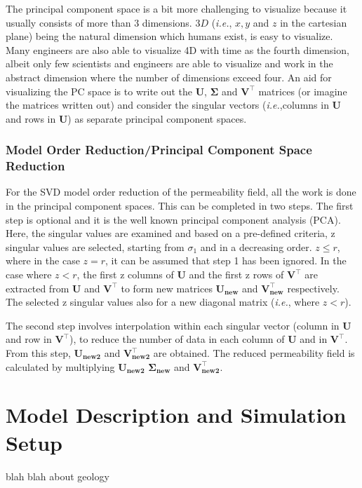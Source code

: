 \documentclass[preprint,12pt]{elsarticle}
\begin{document}
The principal component space is a bit more challenging to visualize because it usually consists of more than $3$ dimensions. $3D$ ({\it i.e.}, $x, y$ and $z$ in the cartesian plane) being the natural dimension which humans exist, is easy to visualize. Many engineers are also able to visualize 4D with time as the fourth dimension, albeit only few scientists and engineers are able to visualize and work in the abstract dimension where the number of dimensions exceed four. An aid for visualizing the PC space is to write out the $\mathbf{U}$, $\mathbf{\Sigma}$ and $\mathbf{V^{\intercal}}$ matrices (or imagine the matrices written out) and consider the singular vectors ({\it i.e.},columns in $\mathbf{U}$ and rows in $\mathbf{U}$) as separate principal component spaces.

\subsubsection{Model Order Reduction/Principal Component Space Reduction}\label{subsubsection:svdcase_preprocess_algorithm}
 For the SVD model order reduction of the permeability field, all the work is done in the principal component spaces. This can be completed in two steps. The first step is optional and it is the well known principal component analysis (PCA). Here, the singular values are examined and based on a pre-defined criteria, z singular values are selected, starting from $\sigma_{1}$ and in a decreasing order. $z \leq r$, where in the case $z = r$, it can be assumed that step 1 has been ignored. In the case where $z < r$, the first z columns of $\mathbf{U}$ and the first z rows of $\mathbf{V^{\intercal}}$ are extracted from $\mathbf{U}$ and $\mathbf{V^{\intercal}}$ to form new matrices $\mathbf{U_{new}}$ and $\mathbf{V^{\intercal}_{new}}$ respectively. The selected z singular values also for a new diagonal matrix ({\it i.e.}, where $z < r$).

The second step involves interpolation within each singular vector (column in $\mathbf{U}$ and row in $\mathbf{V^{\intercal}}$), to reduce the number of data in each column of  $\mathbf{U}$ and in $\mathbf{V^{\intercal}}$. From this step,  $\mathbf{U_{new2}}$ and $\mathbf{V^{\intercal}_{new2}}$ are obtained. The reduced permeability field is calculated by multiplying  $\mathbf{U_{new2}}$ $\mathbf{\Sigma_{new}}$ and $\mathbf{V^{\intercal}_{new2}}$. 

\section{Model Description and Simulation Setup}\label{section:model_simulation}
blah blah about geology
\\
\\
\\
\\
\\
\\
\end{document}
